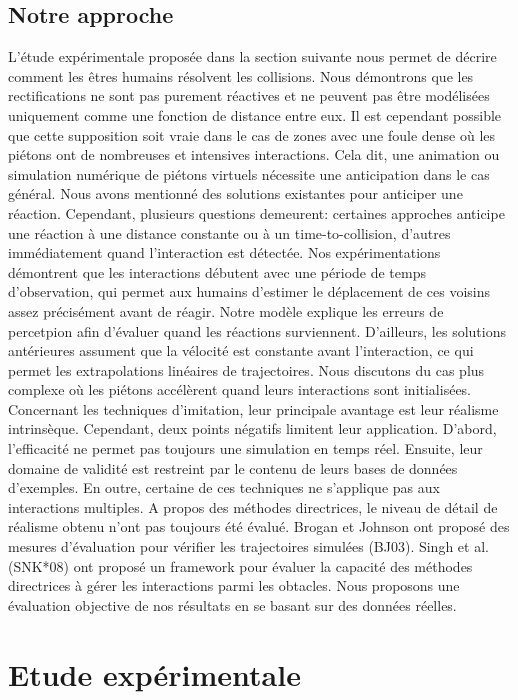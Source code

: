 \documentclass[11pt]{article}
\begin{document}
\subsection*{Notre approche}

L'étude expérimentale proposée dans la section suivante nous permet de décrire comment les êtres humains résolvent les collisions. Nous démontrons que les rectifications ne sont pas purement réactives et ne peuvent pas être modélisées uniquement comme une fonction de distance entre eux. Il est cependant possible que cette supposition soit vraie dans le cas de zones avec une foule dense où les piétons ont de nombreuses et intensives interactions. Cela dit, une animation ou simulation numérique de piétons virtuels nécessite une anticipation dans le cas général. Nous avons mentionné des solutions existantes pour anticiper une réaction. Cependant, plusieurs questions demeurent: certaines approches anticipe une réaction à une distance constante ou à un time-to-collision, d'autres immédiatement quand l'interaction est détectée. Nos expérimentations démontrent que les interactions débutent avec une période de temps d'observation, qui permet aux humains d'estimer le déplacement de ces voisins assez précisément avant de réagir. Notre modèle explique les erreurs de percetpion afin d'évaluer quand les réactions surviennent. D'ailleurs, les solutions antérieures assument que la vélocité est constante avant l'interaction, ce qui permet les extrapolations linéaires de trajectoires. Nous discutons du cas plus complexe où les piétons accélèrent quand leurs interactions sont initialisées. Concernant les techniques d'imitation, leur principale avantage est leur réalisme intrinsèque. Cependant, deux points négatifs limitent leur application. D'abord, l'efficacité ne permet pas toujours une simulation en temps réel. Ensuite, leur domaine de validité est restreint par le contenu de leurs bases de données d'exemples. En outre, certaine de ces techniques ne s'applique pas aux interactions multiples. A propos des méthodes directrices, le niveau de détail de réalisme obtenu n'ont pas toujours été évalué. Brogan et Johnson ont proposé des mesures d'évaluation pour vérifier les trajectoires simulées (BJ03). Singh et al. (SNK*08) ont proposé un framework pour évaluer la capacité des méthodes directrices à gérer les interactions parmi les obtacles. Nous proposons une évaluation objective de nos résultats en se basant sur des données réelles.

\section{Etude expérimentale}
\end{document}
